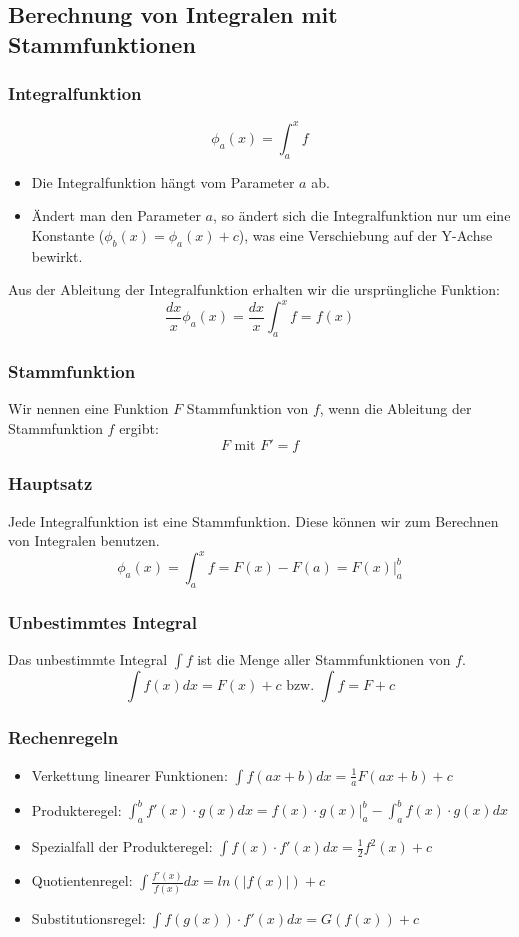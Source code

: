 \subsection{Berechnung von Integralen mit Stammfunktionen}
\subsubsection{Integralfunktion}
\[ \phi_a(x) = \int_a^x f \]
\begin{itemize}
  \item Die Integralfunktion hängt vom Parameter $a$ ab.
  \item Ändert man den Parameter $a$, so ändert sich die
  Integralfunktion nur um eine Konstante ($\phi_b(x) = \phi_a(x) + c$),
  was eine Verschiebung auf der Y-Achse bewirkt.
\end{itemize}

Aus der Ableitung der Integralfunktion erhalten wir die ursprüngliche Funktion:
\[ \frac{dx}{x} \phi_a(x) = \frac{dx}{x} \int_a^x f = f(x) \]

\subsubsection{Stammfunktion}
Wir nennen eine Funktion $F$ Stammfunktion von $f$, wenn die Ableitung
der Stammfunktion $f$ ergibt:
\[F \text{ mit } F' = f\]
\subsubsection{Hauptsatz}
Jede Integralfunktion ist eine Stammfunktion. Diese können wir zum
Berechnen von Integralen benutzen.
\[\phi_a(x) = \int_a^x f  = F(x) - F(a) = F(x)|^b_a\]

\subsubsection{Unbestimmtes Integral}
Das unbestimmte Integral $\int f$ ist die Menge aller Stammfunktionen
von $f$.
\[ \int f(x) dx = F(x) + c \text{ bzw. } \int f = F + c\]

\subsubsection{Rechenregeln}
\begin{itemize}
  \item Verkettung linearer Funktionen: $\int f(ax+b)dx = \frac{1}{a}F(ax+b) + c$
  \item Produkteregel: $\int_a^b f'(x) \cdot g(x) dx =
    f(x) \cdot g(x)|^b_a - \int_a^b f(x) \cdot g(x) dx$
  \item Spezialfall der Produkteregel: $\int f(x) \cdot f'(x) dx = \frac{1}{2}f^2(x) + c$
  \item Quotientenregel: $\int \frac{f'(x)}{f(x)}dx = ln(|f(x)|) + c$
  \item Substitutionsregel: $ \int f(g(x)) \cdot f'(x) dx = G(f(x)) + c$
\end{itemize}


